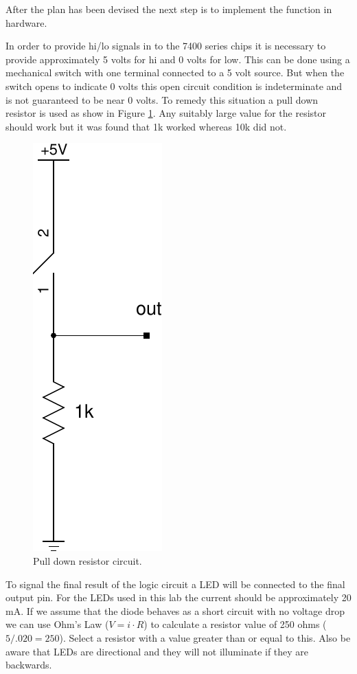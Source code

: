\documentclass[12pt]{article}
\begin{document}
After the plan has been devised the next step is to implement the
function in hardware.

In order to provide hi/lo signals in to the 7400 series chips
\cite{wiki:7400_series} it is necessary to provide approximately 5 volts for
hi and 0 volts for low.
This can be done using a mechanical switch with one terminal connected
to a 5 volt source.
But when the switch opens to indicate 0 volts this open circuit condition
is indeterminate and is not guaranteed to be near 0 volts.
To remedy this situation a pull down resistor is used as show in Figure \ref{fig:pulldown}.
Any suitably large value for the resistor should work but it was found
that 1k worked whereas 10k did not.

\begin{figure}[!hbtp]
\center
\includegraphics[scale=0.6]{pulldown}
\caption{Pull down resistor circuit.}
\label{fig:pulldown}
\end{figure}

To signal the final result of the logic circuit a LED will
be connected to the final output pin.
For the LEDs used in this lab the current should be approximately
20 mA.
If we assume that the diode behaves as a short circuit with
no voltage drop we can use Ohm's Law ($V = i \cdot R$) to calculate a
resistor value of 250 ohms ($5 / .020 = 250$).
Select a resistor with a value greater than or equal to this.
Also be aware that LEDs are directional and they will not illuminate
if they are backwards.
\end{document}
